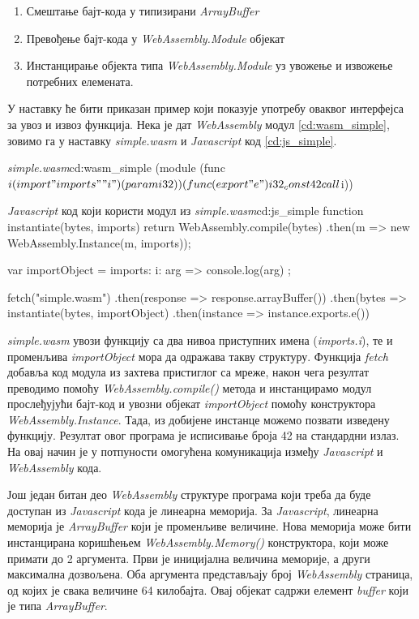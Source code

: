 \documentclass[12pt,oneside]{memoir}
\begin{document}
\begin{enumerate}
	\item Смештање бајт-кода у типизирани \textit{ArrayBuffer}
	\item Превођење бајт-кода у \textit{WebAssembly.Module} објекат
	\item Инстанцирање објекта типа \textit{WebAssembly.Module} уз увожење и извожење потребних елемената.
\end{enumerate}

У наставку ће бити приказан пример који показује употребу оваквог интерфејса за увоз и извоз функција. Нека је дат \textit{WebAssembly} модул
\ref{cd:wasm_simple}, зовимо га у наставку \textit{simple.wasm} и \textit{Javascript} код \ref{cd:js_simple}.

\begin{code}{\textit{simple.wasm}}{cd:wasm_simple}
(module
	(func $i (import "imports" "i") (param i32))
	(func (export "e")
		i32_const 42
		call $i))
\end{code}

\begin{code}{\textit{Javascript} код који користи модул из \textit{simple.wasm}}{cd:js_simple}
function instantiate(bytes, imports) {
	return WebAssembly.compile(bytes)
	.then(m => new WebAssembly.Instance(m, imports));
}

var importObject = 
	{ imports: { i: arg => console.log(arg) } };

fetch("simple.wasm")
.then(response => response.arrayBuffer())
.then(bytes => instantiate(bytes, importObject)
.then(instance => instance.exports.e())
\end{code}

\textit{simple.wasm} увози функцију са два нивоа приступних имена (\textit{imports.i}), те и
променљива \textit{importObject} мора да одражава такву структуру. Функција \textit{fetch} добавља код модула из захтева 
пристиглог са мреже, након чега резултат преводимо помоћу \textit{WebAssembly.compile()} метода и инстанцирамо модул прослеђујући бајт-код
и увозни објекат \textit{importObject} помоћу конструктора \textit{WebAssembly.Instance}. Тада, из добијене инстанце можемо позвати
изведену функцију. Резултат овог програма је исписивање броја 42 на стандардни излаз. На овај начин је у потпуности омогућена комуникација
између \textit{Javascript} и \textit{WebAssembly} кода.

Још један битан део \textit{WebAssembly} структуре програма који треба да буде доступан из \textit{Javascript} кода је
линеарна меморија. За \textit{Javascript}, линеарна меморија је \textit{ArrayBuffer} који је променљиве величине. Нова меморија
може бити инстанцирана коришћењем \textit{WebAssembly.Memory()} конструктора, који може примати до 2 аргумента. Први је иницијална
величина меморије, а други максимална дозвољена. Оба аргумента представљају број \textit{WebAssembly} страница, од којих је свака
величине 64 килобајта. Овај објекат садржи елемент \textit{buffer} који је типа \textit{ArrayBuffer}.
\end{document}
